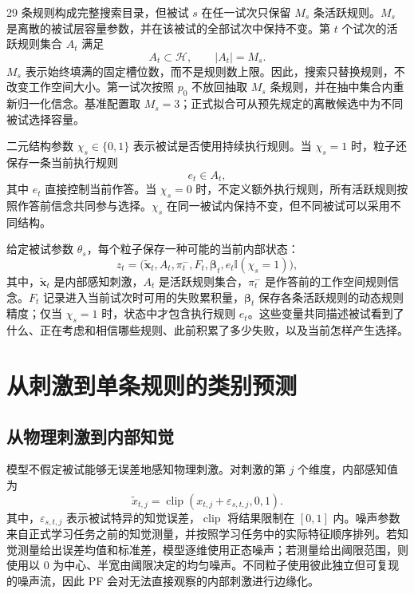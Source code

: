 \documentclass[12pt]{article}
\newcommand{\ind}{\mathbb I}
\begin{document}
29 条规则构成完整搜索目录，但被试 $s$ 在任一试次只保留 $M_s$ 条活跃规则。$M_s$ 是离散的被试层容量参数，并在该被试的全部试次中保持不变。第 $t$ 个试次的活跃规则集合 $A_t$ 满足
\begin{equation}
A_t\subset\mathcal H,
\qquad
|A_t|=M_s.
\label{eq:active-set}
\end{equation}
$M_s$ 表示始终填满的固定槽位数，而不是规则数上限。因此，搜索只替换规则，不改变工作空间大小。第一试次按照 $p_0$ 不放回抽取 $M_s$ 条规则，并在抽中集合内重新归一化信念。基准配置取 $M_s=3$；正式拟合可从预先规定的离散候选中为不同被试选择容量。

二元结构参数 $\chi_s\in\{0,1\}$ 表示被试是否使用持续执行规则。当 $\chi_s=1$ 时，粒子还保存一条当前执行规则
\begin{equation}
e_t\in A_t,
\label{eq:executed-rule}
\end{equation}
其中 $e_t$ 直接控制当前作答。当 $\chi_s=0$ 时，不定义额外执行规则，所有活跃规则按照作答前信念共同参与选择。$\chi_s$ 在同一被试内保持不变，但不同被试可以采用不同结构。

给定被试参数 $\theta_s$，每个粒子保存一种可能的当前内部状态：
\begin{equation}
z_t=
\bigl(
\widetilde{\bm x}_t,
A_t,
\pi_t^{-},
F_t,
\bm\beta_t,
e_t\ind(\chi_s=1)
\bigr),
\label{eq:latent-state}
\end{equation}
其中，$\widetilde{\bm x}_t$ 是内部感知刺激，$A_t$ 是活跃规则集合，$\pi_t^{-}$ 是作答前的工作空间规则信念。$F_t$ 记录进入当前试次时可用的失败累积量，$\bm\beta_t$ 保存各条活跃规则的动态规则精度；仅当 $\chi_s=1$ 时，状态中才包含执行规则 $e_t$。这些变量共同描述被试看到了什么、正在考虑和相信哪些规则、此前积累了多少失败，以及当前怎样产生选择。


\section{从刺激到单条规则的类别预测}

\subsection{从物理刺激到内部知觉}

模型不假定被试能够无误差地感知物理刺激。对刺激的第 $j$ 个维度，内部感知值为
\begin{equation}
\widetilde x_{t,j}
=\operatorname{clip}(x_{t,j}+\varepsilon_{s,t,j},0,1).
\label{eq:perception}
\end{equation}
其中，$\varepsilon_{s,t,j}$ 表示被试特异的知觉误差，$\operatorname{clip}$ 将结果限制在 $[0,1]$ 内。噪声参数来自正式学习任务之前的知觉测量，并按照学习任务中的实际特征顺序排列。若知觉测量给出误差均值和标准差，模型逐维使用正态噪声；若测量给出阈限范围，则使用以 0 为中心、半宽由阈限决定的均匀噪声。不同粒子使用彼此独立但可复现的噪声流，因此 PF 会对无法直接观察的内部刺激进行边缘化。
\end{document}
